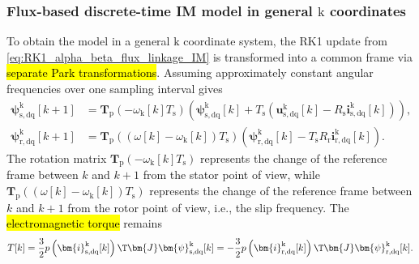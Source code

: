 \begin{frame}
    \frametitle{Flux-based discrete-time IM model in general $\mathrm{k}$ coordinates}
    To obtain the model in a general $\mathrm{k}$ coordinate system, the RK1 update from \eqref{eq:RK1_alpha_beta_flux_linkage_IM} is transformed into a common frame via \hl{separate Park transformations}. Assuming approximately constant angular frequencies over one sampling interval gives
    \begin{equation}
        \begin{split}
            \bm{\psi}^{\mathrm{k}}_\mathrm{s,dq}[k+1]
             & =\bm{T}_\mathrm{p}(-\omega_\mathrm{k}[k]T_\mathrm{s})
            \left(\bm{\psi}^{\mathrm{k}}_\mathrm{s,dq}[k]
            +T_\mathrm{s}\left(\bm{u}^{\mathrm{k}}_\mathrm{s,dq}[k]-R_\mathrm{s}\bm{i}^{\mathrm{k}}_\mathrm{s,dq}[k]\right)\right), \\[0.5ex]
            \bm{\psi}^{\mathrm{k}}_\mathrm{r,dq}[k+1]
             & =\bm{T}_\mathrm{p}((\omega[k]-\omega_\mathrm{k}[k])T_\mathrm{s})
            \left(\bm{\psi}^{\mathrm{k}}_\mathrm{r,dq}[k]
            -T_\mathrm{s}R_\mathrm{r}\bm{i}^{\mathrm{k}}_\mathrm{r,dq}[k]
            \right).
        \end{split}
        \label{eq:RK1_k_flux_linkage_IM}
    \end{equation}\pause%
    The rotation matrix $\bm{T}_\mathrm{p}(-\omega_\mathrm{k}[k]T_\mathrm{s})$ represents the change of the reference frame between $k$ and $k+1$ from the stator point of view, while $\bm{T}_\mathrm{p}((\omega[k]-\omega_\mathrm{k}[k])T_\mathrm{s})$ represents the change of the reference frame between $k$ and $k+1$ from the rotor point of view, i.e., the slip frequency. \pause The \hl{electromagnetic torque} remains
    \begin{equation}
        T[k]=\frac{3}{2}p\left(\bm{i}^{\mathrm{k}}_\mathrm{s,dq}[k]\right)\T\bm{J}\bm{\psi}^{\mathrm{k}}_\mathrm{s,dq}[k]
        =-\frac{3}{2}p\left(\bm{i}^{\mathrm{k}}_\mathrm{r,dq}[k]\right)\T\bm{J}\bm{\psi}^{\mathrm{k}}_\mathrm{r,dq}[k].
        \label{eq:discrete_time_IM_torque}    \end{equation}
\end{frame}

